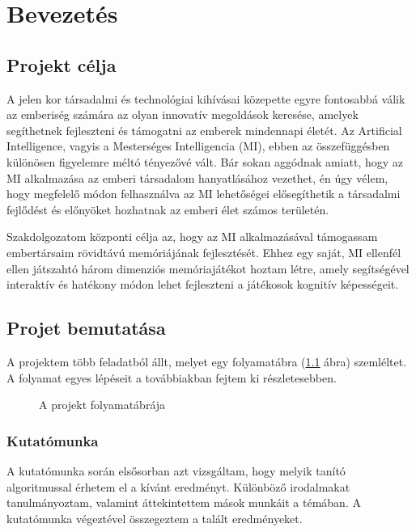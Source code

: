 \chapter{Bevezetés}
\usetikzlibrary{shapes,arrows}

\thispagestyle{fancy}
\pagestyle{fancy}
\section{Projekt célja}
A jelen kor társadalmi és technológiai kihívásai közepette egyre fontosabbá válik az emberiség számára az olyan innovatív megoldások keresése, amelyek segíthetnek fejleszteni és támogatni az emberek mindennapi életét.
Az Artificial Intelligence, vagyis a Mesterséges Intelligencia  (MI), ebben az összefüggésben különösen figyelemre méltó tényezővé vált. 
Bár sokan aggódnak amiatt, hogy az MI alkalmazása az emberi társadalom hanyatlásához vezethet, én úgy vélem, hogy  megfelelő módon felhasználva az MI lehetőségei elősegíthetik a társadalmi fejlődést és előnyöket hozhatnak az emberi élet számos területén.

Szakdolgozatom központi célja az, hogy az MI alkalmazásával támogassam embertársaim rövidtávú memóriájának fejlesztését.
Ehhez egy saját, MI ellenfél ellen játszahtó három dimenziós memóriajátékot hoztam létre, amely segítségével interaktív és hatékony módon lehet fejleszteni a játékosok kognitív képességeit. 
\section{Projet bemutatása}

A projektem több feladatból állt, melyet egy folyamatábra (\ref{fig:folyamat_diagram} ábra) szemléltet. 
A folyamat egyes lépéseit a továbbiakban fejtem ki részletesebben.
\begin{figure}[H]
    \centering
    
    \caption{A projekt folyamatábrája}
    \label{fig:folyamat_diagram}
\end{figure}

\subsection{Kutatómunka}
A kutatómunka során elsősorban azt vizsgáltam, hogy melyik tanító algoritmussal érhetem el a kívánt eredményt. Különböző irodalmakat tanulmányoztam, valamint áttekintettem mások munkáit a témában. A kutatómunka végeztével összegeztem a talált eredményeket.


